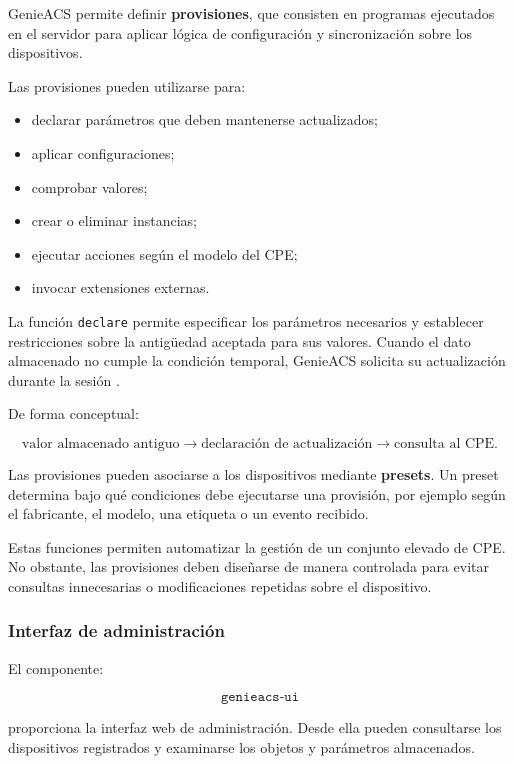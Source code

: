 GenieACS permite definir \textbf{provisiones}, que consisten en programas
ejecutados en el servidor para aplicar lógica de configuración y
sincronización sobre los dispositivos.

Las provisiones pueden utilizarse para:

\begin{itemize}
    \item declarar parámetros que deben mantenerse actualizados;
    \item aplicar configuraciones;
    \item comprobar valores;
    \item crear o eliminar instancias;
    \item ejecutar acciones según el modelo del CPE;
    \item invocar extensiones externas.
\end{itemize}

La función \texttt{declare} permite especificar los parámetros necesarios
y establecer restricciones sobre la antigüedad aceptada para sus valores.
Cuando el dato almacenado no cumple la condición temporal, GenieACS
solicita su actualización durante la sesión
\cite{genieacs_documentation}.

De forma conceptual:

\[
    \text{valor almacenado antiguo}
    \longrightarrow
    \text{declaración de actualización}
    \longrightarrow
    \text{consulta al CPE}.
\]

Las provisiones pueden asociarse a los dispositivos mediante
\textbf{presets}. Un preset determina bajo qué condiciones debe ejecutarse
una provisión, por ejemplo según el fabricante, el modelo, una etiqueta o
un evento recibido.

Estas funciones permiten automatizar la gestión de un conjunto elevado de
CPE. No obstante, las provisiones deben diseñarse de manera controlada
para evitar consultas innecesarias o modificaciones repetidas sobre el
dispositivo.


\subsubsection*{Interfaz de administración}

El componente:

\[
    \texttt{genieacs-ui}
\]

proporciona la interfaz web de administración. Desde ella pueden
consultarse los dispositivos registrados y examinarse los objetos y
parámetros almacenados.

